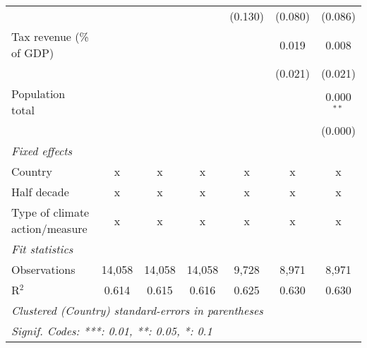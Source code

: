 \begin{tabular}{lcccccc}
                                                    &         &                &                & (0.130)        & (0.080)        & (0.086)\\   
   Tax revenue (\% of GDP)                          &         &                &                &                & 0.019          & 0.008\\   
                                                    &         &                &                &                & (0.021)        & (0.021)\\   
   Population total                                 &         &                &                &                &                & 0.000$^{**}$\\   
                                                    &         &                &                &                &                & (0.000)\\   
   \emph{Fixed effects}\\
   Country                                          & x       & x              & x              & x              & x              & x\\  
   Half decade                                      & x       & x              & x              & x              & x              & x\\  
   Type of climate action/measure                   & x       & x              & x              & x              & x              & x\\  
   \midrule \emph{Fit statistics}\\
   Observations                                     & 14,058  & 14,058         & 14,058         & 9,728          & 8,971          & 8,971\\  
   R$^2$                                            & 0.614   & 0.615          & 0.616          & 0.625          & 0.630          & 0.630\\  
   \midrule
   \multicolumn{7}{l}{\emph{Clustered (Country) standard-errors in parentheses}}\\
   \multicolumn{7}{l}{\emph{Signif. Codes: ***: 0.01, **: 0.05, *: 0.1}}\\
\end{tabular}
\par\endgroup


